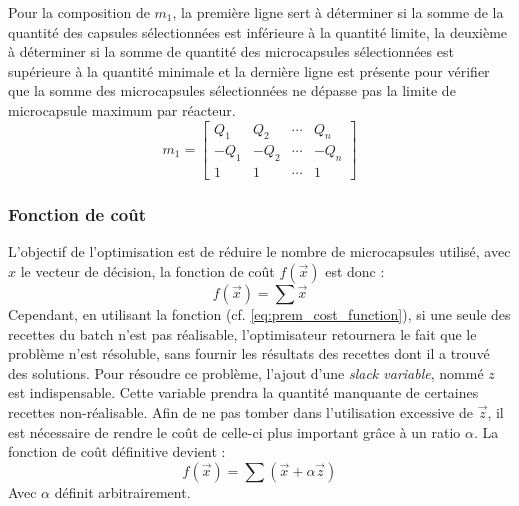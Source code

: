 Pour la composition de $m_1$, la première ligne sert à déterminer si la somme de la quantité des capsules sélectionnées est inférieure à la quantité limite, la deuxième à déterminer si la somme de  quantité des \glspl{microcapsule} sélectionnées est supérieure à la quantité minimale et la dernière ligne est présente pour vérifier que la somme des \glspl{microcapsule} sélectionnées ne dépasse pas la limite de \gls{microcapsule} maximum par réacteur.
\begin{equation}
    m_1 = \left[\begin{array}{cccc}
        Q_1  & Q_2  & \cdots & Q_n\\
        -Q_1 & -Q_2 & \cdots & -Q_n\\
        1    & 1    & \cdots & 1
    \end{array}\right]
\end{equation}
\subsubsection{Fonction de coût}\label{subsubsection:fonction_de_cout}
L'objectif de l'optimisation est de réduire le nombre de \glspl{microcapsule} utilisé, avec $x$ le vecteur de décision, la fonction de coût $f(\overrightarrow{x} )$ est donc : 
\begin{equation}
    f\left(\overrightarrow{x}\right) = \sum \overrightarrow{x} 
    \label{eq:prem_cost_function}
\end{equation}
Cependant, en utilisant la fonction (cf. \autoref{eq:prem_cost_function}), si une seule des \glspl{recette} du batch n'est pas réalisable, l'optimisateur retournera le fait que le problème n'est résoluble, sans fournir les résultats des \glspl{recette} dont il a trouvé des solutions. Pour résoudre ce problème, l'ajout d'une \textit{slack variable}, nommé $z$ est indispensable. Cette variable prendra la quantité manquante de certaines recettes non-réalisable. Afin de ne pas tomber dans l'utilisation excessive de $\overrightarrow{z}$, il est nécessaire de rendre le coût de celle-ci plus important grâce à un ratio $\alpha$. La fonction de coût définitive devient :
\begin{equation}
    f\left(\overrightarrow{x}\right) = \sum\left(\overrightarrow{x} + \alpha \overrightarrow{z} \right)
    \label{eq:cost_function}
\end{equation}
Avec $\alpha$ définit arbitrairement.